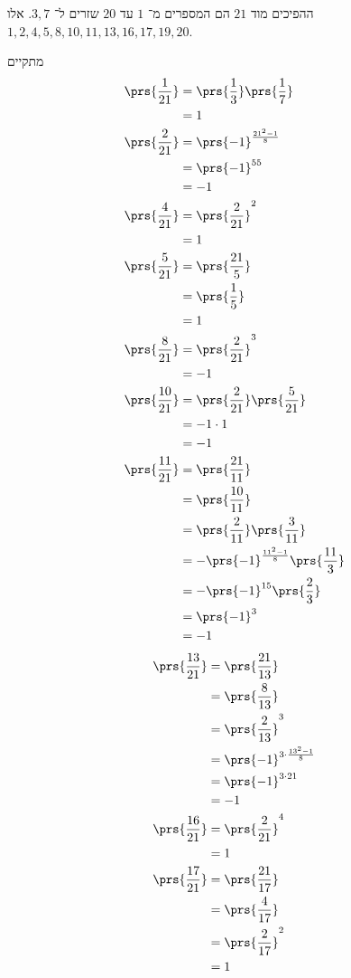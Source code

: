 \documentclass[a4paper,10pt,twoside,openany]{book}
\begin{document}
\begin{solution}
ההפיכים מוד
$21$
הם המספרים מ־%
$1$
עד
$20$
שזרים ל־%
$3,7$.
אלו
$1, 2, 4, 5, 8, 10, 11, 13, 16, 17, 19, 20$.

מתקיים
\begin{align*}
\prs{\frac{1}{21}} &= \prs{\frac{1}{3}} \prs{\frac{1}{7}}
\\&= 1
\\
\prs{\frac{2}{21}} &= \prs{-1}^{\frac{21^2 - 1}{8}}
\\&= \prs{-1}^{55}
\\&= -1
\\
\prs{\frac{4}{21}} &= \prs{\frac{2}{21}}^2
\\&=
1
\\
\prs{\frac{5}{21}} &= \prs{\frac{21}{5}}
\\&=
\prs{\frac{1}{5}}
\\&=
1
\\
\prs{\frac{8}{21}} &= \prs{\frac{2}{21}}^3
\\&=
-1
\\
\prs{\frac{10}{21}} &= \prs{\frac{2}{21}} \prs{\frac{5}{21}}
\\&= -1 \cdot 1
\\&= -1
\\
\prs{\frac{11}{21}} &= \prs{\frac{21}{11}}
\\&= \prs{\frac{10}{11}}
\\&= \prs{\frac{2}{11}} \prs{\frac{3}{11}}
\\&= - \prs{-1}^{\frac{11^2 - 1}{8}} \prs{\frac{11}{3}}
\\&= - \prs{-1}^{15} \prs{\frac{2}{3}}
\\&= \prs{-1}^3
\\&= -1
\end{align*}
\begin{align*}
\prs{\frac{13}{21}} &= \prs{\frac{21}{13}}
\\&= \prs{\frac{8}{13}}
\\&= \prs{\frac{2}{13}}^3
\\&= \prs{-1}^{3 \cdot \frac{13^2 - 1}{8}}
\\&= \prs{-1}^{3 \cdot 21}
\\&= -1
\\
\prs{\frac{16}{21}} &= \prs{\frac{2}{21}}^4
\\&= 1
\\
\prs{\frac{17}{21}} &= \prs{\frac{21}{17}}
\\&= \prs{\frac{4}{17}}
\\&= \prs{\frac{2}{17}}^2
\\&= 1

\end{align*}
\end{solution}
\end{document}
